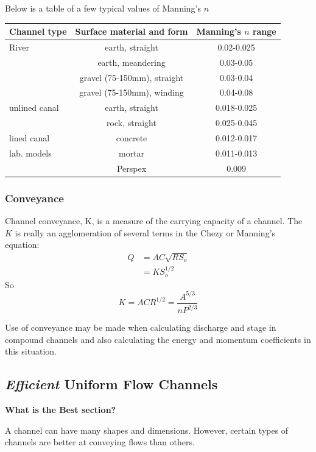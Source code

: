 \documentclass[a4paper, 12pt, british]{article} %
\numberwithin{equation}{section}
\numberwithin{figure}{section}
\numberwithin{table}{section}
\begin{document}
Below is a table of a few typical values of Manning's $n$

\begin{table}[H]
	\centering
	\begin{tabular}{l|c|c}
		\hline
\textbf{Channel type}&\textbf{Surface material and form}&\textbf{Manning's $n$ range }\\
\hline
River&earth, straight&0.02-0.025\\
&earth, meandering&0.03-0.05\\
&gravel (75-150mm), straight&0.03-0.04\\
&gravel (75-150mm), winding&0.04-0.08\\
\hline
unlined canal&earth, straight&0.018-0.025\\
&rock, straight&0.025-0.045\\
\hline
lined canal&concrete&0.012-0.017\\
\hline
lab. models&mortar&0.011-0.013\\
&Perspex& 0.009\\
\hline
\end{tabular}
\end{table}
	
\subsubsection{Conveyance}
Channel conveyance, K, is a measure of the carrying capacity of a channel. The $K$ is really an agglomeration of several terms in the Chezy or Manning's equation:
\begin{align}
Q &= AC\sqrt{R S_o} \nonumber \\
&= KS_o^{1/2}
\label{eq:manning_conveyance}
\end{align} 
 So
\begin{equation}
K = ACR^{1/2} = \frac{A^{5/3}}{n P^{2/3}}
\label{eq:conveyance}
\end{equation} 

Use of conveyance may be made when calculating discharge and stage in compound channels and also calculating the energy and momentum coefficients in this situation.

\subsection{\textit{Efficient} Uniform Flow Channels }

\textbf{What is the Best section?}

A channel can have many shapes and dimensions. However, certain types of channels are better at conveying flows than others.
\end{document}

